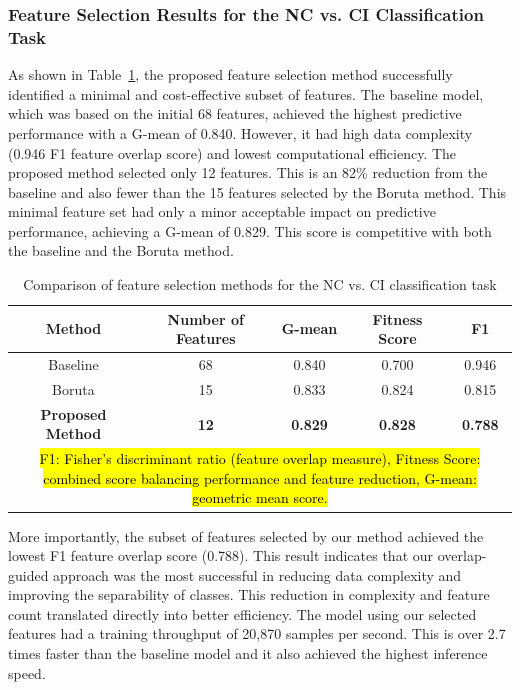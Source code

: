 \subsubsection{Feature Selection Results for the NC vs. CI Classification Task}\label{sec:feature-selection-task1}

As shown in Table~\ref{table:fs-task1}, the proposed feature selection method successfully identified a minimal and cost-effective subset of features. The baseline model, which was based on the initial 68 features, achieved the highest predictive performance with a G-mean of 0.840. However, it had high data complexity (0.946 F1 feature overlap score) and lowest computational efficiency. The proposed method selected only 12 features. This is an 82\% reduction from the baseline and also fewer than the 15 features selected by the Boruta method. This minimal feature set had only a minor acceptable impact on predictive performance, achieving a G-mean of 0.829. This score is competitive with both the baseline and the Boruta method.

\begin{table}[!ht]
    \centering
    \caption{Comparison of feature selection methods for the NC vs. CI classification task}
    \begin{tabular}{|c|c|c|c|c|}
    \hline
        Method & Number of Features & G-mean & Fitness Score & F1 \\ \hline
        Baseline & 68 & 0.840 & 0.700 & 0.946 \\ \hline
        Boruta & 15 & 0.833 & 0.824 & 0.815 \\ \hline
        \textbf{Proposed Method} & \textbf{12} & \textbf{0.829} & \textbf{0.828} & \textbf{0.788} \\ \hline
        \multicolumn{5}{p{400pt}}{\footnotesize \hl{F1: Fisher's discriminant ratio (feature overlap measure), Fitness Score: combined score balancing performance and feature reduction, G-mean: geometric mean score.}}
    \end{tabular}
    \label{table:fs-task1}
\end{table}

More importantly, the subset of features selected by our method achieved the lowest F1 feature overlap score (0.788). This result indicates that our overlap-guided approach was the most successful in reducing data complexity and improving the separability of classes. This reduction in complexity and feature count translated directly into better efficiency. The model using our selected features had a training throughput of 20,870 samples per second. This is over 2.7 times faster than the baseline model and it also achieved the highest inference speed.

